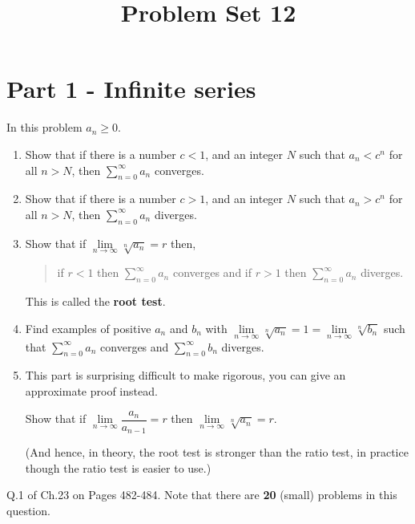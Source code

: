 \documentclass[9pt, a4paper, oneside, reqno]{amsart}
\title{Problem Set 12}
\begin{document}
\maketitle
\thispagestyle{fancy}


\section*{Part 1 - Infinite series}
\begin{questions}

	\item 		In this problem $ a_n \ge 0$.
	\begin{enumerate}
		\item Show that if there is a number $ c < 1$, and an integer $ N$ such that $ a_n < c^n$ for all $ n > N$, then $ \sum \limits_{n=0}^\infty a_n$ converges.
		\item Show that if there is a number $ c > 1$, and an integer $ N$ such that $ a_n > c^n$ for all $ n > N$, then $ \sum \limits_{n=0}^\infty a_n$ diverges.
		\item Show that if $ \lim \limits_{n\rightarrow \infty} \sqrt[n]{a_n} = r $ then,
		      \begin{quote}
			      if $ r < 1$ then $ \sum \limits_{n=0}^\infty a_n$ converges and if $ r> 1$ then $ \sum \limits_{n=0}^\infty a_n$ diverges.
		      \end{quote} This is called the \textbf{root test}.
		\item Find examples of positive $ a_n$ and $ b_n$ with $ \lim \limits_{n\rightarrow \infty} \sqrt[n]{a_n} = 1 = \lim \limits_{n\rightarrow \infty} \sqrt[n]{b_n}$ such that $\sum \limits_{n=0}^\infty a_n$ converges and $\sum \limits_{n=0}^\infty b_n$ diverges.
		\item This part is surprising difficult to make rigorous, you can give an approximate proof instead.

		      Show that if $ \lim \limits_{n\rightarrow \infty} \dfrac{a_n}{a_{n-1}} = r$ then $ \lim \limits_{n\rightarrow \infty} \sqrt[n]{a_n} = r $.

		      (And hence, in theory, the root test is stronger than the ratio test, in practice though the ratio test is easier to use.)
	\end{enumerate}

	\item Q.1 of Ch.23 on Pages 482-484. Note that there are \textbf{20} (small) problems in this question.
\end{questions}
\end{document}
